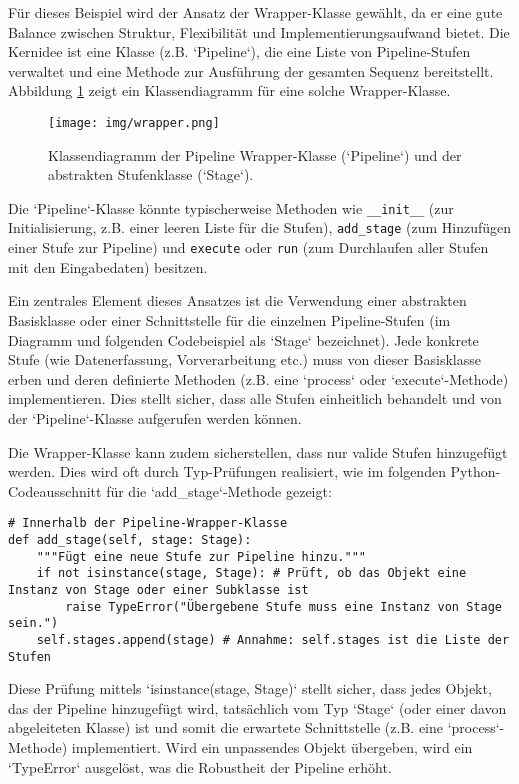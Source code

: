 \documentclass[a4paper]{article} %
\begin{document}
Für dieses Beispiel wird der Ansatz der Wrapper-Klasse gewählt, da er eine gute Balance zwischen Struktur, Flexibilität und Implementierungsaufwand bietet. Die Kernidee ist eine Klasse (z.B. `Pipeline`), die eine Liste von Pipeline-Stufen verwaltet und eine Methode zur Ausführung der gesamten Sequenz bereitstellt. Abbildung \ref{fig:wrapper} zeigt ein Klassendiagramm für eine solche Wrapper-Klasse.

\begin{figure}[htbp]
    \centering
    \texttt{[image: img/wrapper.png]}
    \caption{Klassendiagramm der Pipeline Wrapper-Klasse (`Pipeline`) und der abstrakten Stufenklasse (`Stage`).}
    \label{fig:wrapper}
\end{figure}

Die `Pipeline`-Klasse könnte typischerweise Methoden wie \texttt{\_\_init\_\_} (zur Initialisierung, z.B. einer leeren Liste für die Stufen), \texttt{add\_stage} (zum Hinzufügen einer Stufe zur Pipeline) und \texttt{execute} oder \texttt{run} (zum Durchlaufen aller Stufen mit den Eingabedaten) besitzen.

Ein zentrales Element dieses Ansatzes ist die Verwendung einer abstrakten Basisklasse oder einer Schnittstelle für die einzelnen Pipeline-Stufen (im Diagramm und folgenden Codebeispiel als `Stage` bezeichnet). Jede konkrete Stufe (wie Datenerfassung, Vorverarbeitung etc.) muss von dieser Basisklasse erben und deren definierte Methoden (z.B. eine `process` oder `execute`-Methode) implementieren. Dies stellt sicher, dass alle Stufen einheitlich behandelt und von der `Pipeline`-Klasse aufgerufen werden können.

Die Wrapper-Klasse kann zudem sicherstellen, dass nur valide Stufen hinzugefügt werden. Dies wird oft durch Typ-Prüfungen realisiert, wie im folgenden Python-Codeausschnitt für die `add_stage`-Methode gezeigt:

\begin{verbatim}
# Innerhalb der Pipeline-Wrapper-Klasse
def add_stage(self, stage: Stage):
    """Fügt eine neue Stufe zur Pipeline hinzu."""
    if not isinstance(stage, Stage): # Prüft, ob das Objekt eine Instanz von Stage oder einer Subklasse ist
        raise TypeError("Übergebene Stufe muss eine Instanz von Stage sein.")
    self.stages.append(stage) # Annahme: self.stages ist die Liste der Stufen
\end{verbatim}

Diese Prüfung mittels `isinstance(stage, Stage)` stellt sicher, dass jedes Objekt, das der Pipeline hinzugefügt wird, tatsächlich vom Typ `Stage` (oder einer davon abgeleiteten Klasse) ist und somit die erwartete Schnittstelle (z.B. eine `process`-Methode) implementiert. Wird ein unpassendes Objekt übergeben, wird ein `TypeError` ausgelöst, was die Robustheit der Pipeline erhöht.
\end{document}
